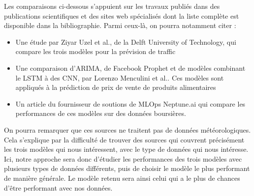 \documentclass[french]{article}
\begin{document}
    Les comparaisons ci-dessous s'appuient sur les travaux publiés dans des publications scientifiques et des sites web spécialisés dont la liste complète est disponible dans la bibliographie. Parmi ceux-là, on pourra notamment citer :
    \begin{itemize}
        \item Une étude par Ziyar Uzel et al., de la Delft University of Technology\cite{uzel}, qui compare les trois modèles pour la prévision de traffic 
        \item Une comparaison d'ARIMA, de Facebook Prophet et de modèles combinant le LSTM à des CNN, par Lorenzo Menculini et al.\cite{menculini}. Ces modèles sont appliqués à la prédiction de prix de vente de produits alimentaires
        \item Un article du fournisseur de soutions de MLOps Neptune.ai\cite{neptune} qui compare les performances de ces modèles sur des données boursières.
    \end{itemize}

    On pourra remarquer que ces sources ne traitent pas de données météorologiques. Cela s'explique par la difficulté de trouver des sources qui couvrent précisément les trois modèles qui nous intéressent, avec le type de données qui nous intéresse. Ici, notre approche sera donc d'étudier les performances des trois modèles avec plusieurs types de données différents, puis de choisir le modèle le plus performant de manière générale. Le modèle retenu sera ainsi celui qui a le plus de chances d'être performant avec nos données.
\end{document}
